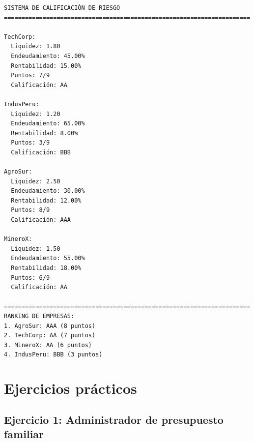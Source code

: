 \documentclass[
  doc,
  floatsintext,
  longtable,
  a4paper,
  nolmodern,
  notxfonts,
  notimes,
  12pt,
  colorlinks=true,linkcolor=blue,citecolor=blue,urlcolor=blue]{apa7}
\begin{document}
\begin{verbatim}
SISTEMA DE CALIFICACIÓN DE RIESGO
======================================================================

TechCorp:
  Liquidez: 1.80
  Endeudamiento: 45.00%
  Rentabilidad: 15.00%
  Puntos: 7/9
  Calificación: AA

IndusPeru:
  Liquidez: 1.20
  Endeudamiento: 65.00%
  Rentabilidad: 8.00%
  Puntos: 3/9
  Calificación: BBB

AgroSur:
  Liquidez: 2.50
  Endeudamiento: 30.00%
  Rentabilidad: 12.00%
  Puntos: 8/9
  Calificación: AAA

MineroX:
  Liquidez: 1.50
  Endeudamiento: 55.00%
  Rentabilidad: 18.00%
  Puntos: 6/9
  Calificación: AA

======================================================================
RANKING DE EMPRESAS:
1. AgroSur: AAA (8 puntos)
2. TechCorp: AA (7 puntos)
3. MineroX: AA (6 puntos)
4. IndusPeru: BBB (3 puntos)
\end{verbatim}

\section{Ejercicios prácticos}\label{ejercicios-pruxe1cticos}

\subsection{Ejercicio 1: Administrador de presupuesto
familiar}\label{ejercicio-1-administrador-de-presupuesto-familiar}
\end{document}
